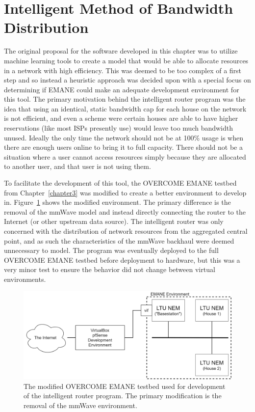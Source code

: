 \section{Intelligent Method of Bandwidth Distribution}
The original proposal for the software developed in this chapter was to utilize machine learning tools to create a model that would be able to allocate resources in a network with high efficiency.
This was deemed to be too complex of a first step and so instead a heuristic approach was decided upon with a special focus on determining if EMANE could make an adequate development environment for this tool.
The primary motivation behind the intelligent router program was the idea that using an identical, static bandwidth cap for each house on the network is not efficient, and even a scheme were certain houses are able to have higher reservations (like most ISPs presently use) would leave too much bandwidth unused.
Ideally the only time the network should not be at 100\% usage is when there are enough users online to bring it to full capacity.
There should not be a situation where a user cannot access resources simply because they are allocated to another user, and that user is not using them.\par
To facilitate the development of this tool, the OVERCOME EMANE testbed from Chapter~\ref{chapter3} was modified to create a better environment to develop in. 
Figure~\ref{pfsense_dev} shows the modified environment.
The primary difference is the removal of the mmWave model and instead directly connecting the router to the Internet (or other upstream data source).
The intelligent router was only concerned with the distribution of network resources from the aggregated central point, and as such the characteristics of the mmWave backhaul were deemed unnecessary to model.
The program was eventually deployed to the full OVERCOME EMANE testbed before deployment to hardware, but this was a very minor test to ensure the behavior did not change between virtual environments.
\begin{figure}[!ht]
    \centering
    \includegraphics[width=\textwidth,keepaspectratio]{Images/Chpt4/pfsense_dev.png}
    \caption{The modified OVERCOME EMANE testbed used for development of the intelligent router program. The primary modification is the removal of the mmWave environment.}
    \label{pfsense_dev}
\end{figure}

